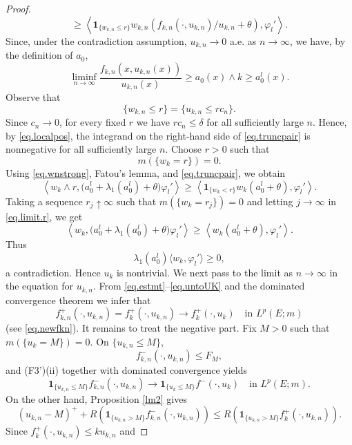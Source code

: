 \documentclass[11pt,a4paper,reqno]{amsart}
\theoremstyle{definition}
\numberwithin{equation}{section}
\begin{document}
\begin{proof}
\begin{equation}
\ge\left\langle\mathbf1_{\{w_{k,n}\le r\}}w_{k,n}\left(f_{k,n}(\cdot,u_{k,n})/u_{k,n}+\theta\right),\varphi_l'\right\rangle.
\end{equation}
Since, under the contradiction assumption, $u_{k,n}\to0$ a.e. as $n\to \infty$, we have,  by the definition of $a_0$,
\[
\liminf_{n\to\infty}
\frac{f_{k,n}(x,u_{k,n}(x))}{u_{k,n}(x)}
\ge
a_0(x)\wedge k
\ge a_0^l(x).
\]
Observe that
\[
\{w_{k,n}\le r\}
=
\{u_{k,n}\le r c_n\}.
\]
Since $c_n\to0$, for every fixed $r$ we have
$r c_n\le\delta$ for all sufficiently large $n$. Hence, by
\eqref{eq.localpos}, the integrand on the right-hand side of
\eqref{eq.truncpair} is nonnegative for all sufficiently large $n$.
Choose $r>0$ such that
\[
m(\{w_k=r\})=0.
\]
Using \eqref{eq.wnstrong}, Fatou's lemma, and
\eqref{eq.truncpair}, we obtain
\begin{equation}
\label{eq.limit.r}
\left\langle
w_k\wedge r,
\bigl(a_0^l+\lambda_1(a_0^l)+\theta\bigr)\varphi_l'
\right\rangle\ge\left\langle\mathbf1_{\{w_k<r\}}w_k(a_0^l+\theta),\varphi_l'\right\rangle.
\end{equation}
Taking a sequence $r_j\uparrow\infty$ such that
$m(\{w_k=r_j\})=0$ and letting $j\to\infty$ in
\eqref{eq.limit.r}, we get
\[
\left\langle
w_k,
\bigl(a_0^l+\lambda_1(a_0^l)+\theta\bigr)\varphi_l'
\right\rangle
\ge
\left\langle
w_k(a_0^l+\theta),
\varphi_l'
\right\rangle .
\]
Thus
\[
\lambda_1(a_0^l)
\langle w_k,\varphi_l'\rangle
\ge0,
\]
a contradiction.
Hence $u_k$ is nontrivial.  
We next pass to the limit as $n\to\infty$ in the equation for
$u_{k,n}$. From \eqref{eq.estmt}--\eqref{eq.untoUK}
and the dominated convergence theorem we infer that
\begin{equation}
\label{eq.posnlim}
f_{k,n}^+(\cdot,u_{k,n})=f_k^+(\cdot,u_{k,n})
\longrightarrow
f_k^+(\cdot,u_k)
\quad\text{in }L^p(E;m)
\end{equation}
(see \eqref{eq.newfkn}). It remains to treat the negative part. Fix $M>0$ such that $m(\{u_k=M\})=0$. On
$\{u_{k,n}\le M\}$,
\[
f_{k,n}^-(\cdot,u_{k,n})
\le
F_M,
\]
and \textup{(F3')(ii)} together with dominated convergence yields
\begin{equation}
\label{eq.localq}
\mathbf1_{\{u_{k,n}\le M\}}f_{k,n}^-(\cdot,u_{k,n})
\longrightarrow
\mathbf1_{\{u_k\le M\}}f^-(\cdot,u_k)
\quad\text{in }L^p(E;m).
\end{equation}
On the other hand, Proposition \ref{lm2} gives
\[
(u_{k,n}-M)^+
+
R\left(
\mathbf1_{\{u_{k,n}>M\}}f_{k,n}^-(\cdot,u_{k,n})
\right)
\le
R\left(
\mathbf1_{\{u_{k,n}>M\}}
f_k^+(\cdot,u_{k,n})
\right).
\]
Since $f_k^+(\cdot,u_{k,n})\le k u_{k,n}$ and

\end{proof}
\end{document}
